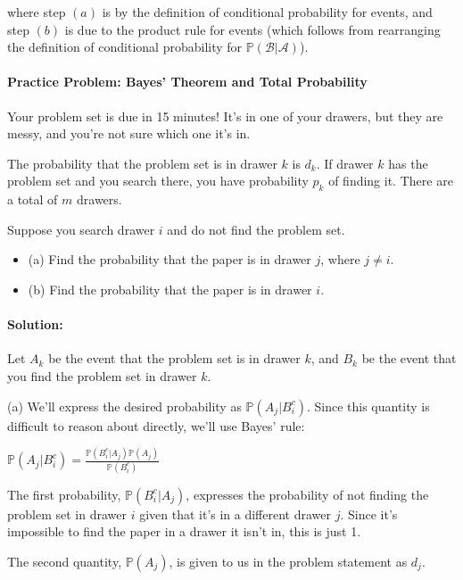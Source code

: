 \documentclass[6008notes.tex]{subfiles}
\begin{document}
where step $(a)$ is by the definition of conditional probability for events, and step $(b)$ is due to the product rule for events (which follows from rearranging the definition of conditional probability for $\mathbb {P}(\mathcal{B} | \mathcal{A})$).

\paragraph{Practice Problem: Bayes' Theorem and Total Probability}

Your problem set is due in 15 minutes! It's in one of your drawers, but they are messy, and you're not sure which one it's in.

The probability that the problem set is in drawer $k$ is $d_k$. If drawer $k$ has the problem set and you search there, you have probability $p_k$ of finding it. There are a total of $m$ drawers.

Suppose you search drawer $i$ and do not find the problem set.

\begin{itemize}
\item (a) Find the probability that the paper is in drawer $j$, where $j \neq i$.

\item (b) Find the probability that the paper is in drawer $i$.
\end{itemize}

\paragraph{Solution:} Let $A_k$ be the event that the problem set is in drawer $k$, and $B_k$ be the event that you find the problem set in drawer $k$.

(a) We'll express the desired probability as $\mathbb {P}(A_ j|B_ i^ c)$. Since this quantity is difficult to reason about directly, we'll use Bayes' rule:

$\mathbb {P}(A_ j|B_ i^ c) = \frac{\mathbb {P}(B_ i^ c | A_ j) \mathbb {P}(A_ j)}{\mathbb {P}(B_ i^ c)}$
 
The first probability, $\mathbb {P}(B_ i^ c | A_ j)$, expresses the probability of not finding the problem set in drawer $i$ given that it's in a different drawer $j$. Since it's impossible to find the paper in a drawer it isn't in, this is just 1.

The second quantity, $\mathbb {P}(A_ j)$, is given to us in the problem statement as $d_j$.
\end{document}
